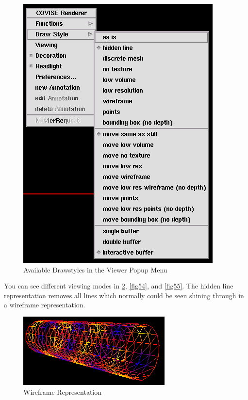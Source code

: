 \begin{itemize}
 \latexonly
 \begin{figure}[htp]
  \begin{center}
   \includegraphics[scale=0.7]{renderer/pict/drawstyle}
   \caption{Available Drawstyles in the Viewer Popup Menu}
	\label{fig52}
  \end{center}
 \end{figure}
 \endlatexonly
 
You can see different viewing modes in  \ref{fig53}, \ref{fig54}, and \ref{fig55}. The
hidden line representation removes all lines which normally could be seen 
shining through in a wireframe representation.

 \latexonly
 \begin{figure}[htp]
  \begin{center}
   \includegraphics[scale=0.7]{renderer/pict/image8}
   \caption{Wireframe Representation}
	\label{fig53}
  \end{center}
 \end{figure}
 \endlatexonly


\end{itemize}
